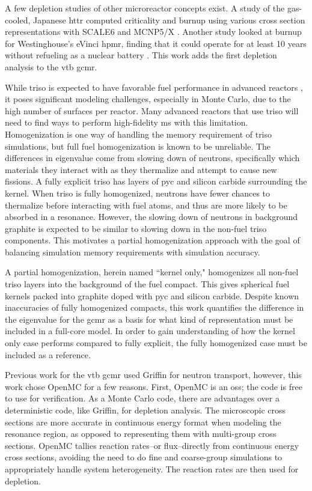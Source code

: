 \documentclass[letterpaper]{physor2024}
\begin{document}
A few depletion studies of other microreactor concepts exist. A study of the gas-cooled, Japanese \gls{httr} computed criticality and burnup using various cross section representations with SCALE6 and MCNP5/X \cite{chiang-gcmr}. Another study looked at burnup for Westinghouse's eVinci \gls{hpmr}, finding that it could operate for at least 10 years without refueling as a nuclear battery \cite{Hernandez-hpmr}. This work adds the first depletion analysis to the \gls{vtb} \gls{gcmr}.

While \gls{triso} is expected to have favorable fuel performance in advanced reactors \cite{triso-overview}, it poses significant modeling challenges, especially in Monte Carlo, due to the high number of surfaces per reactor. Many advanced reactors that use \gls{triso} will need to find ways to perform high-fidelity \gls{ms} with this limitation. Homogenization is one way of handling the memory requirement of \gls{triso} simulations, but full fuel homogenization is known to be unreliable. The differences in eigenvalue come from slowing down of neutrons, specifically which materials they interact with as they thermalize and attempt to cause new fissions. A fully explicit \gls{triso} has layers of \gls{pyc} and silicon carbide surrounding the kernel. When \gls{triso} is fully homogenized, neutrons have fewer chances to thermalize before interacting with fuel atoms, and thus are more likely to be absorbed in a resonance. However, the slowing down of neutrons in background graphite is expected to be similar to slowing down in the non-fuel \gls{triso} components. This motivates a partial homogenization approach with the goal of balancing simulation memory requirements with simulation accuracy.

A partial homogenization, herein named ``kernel only," homogenizes all non-fuel \gls{triso} layers into the background of the fuel compact. This gives spherical fuel kernels packed into graphite doped with \gls{pyc} and silicon carbide. Despite known inaccuracies of fully homogenized compacts, this work quantifies the difference in the eigenvalue for the \gls{gcmr} as a basis for what kind of representation must be included in a full-core model. In order to gain understanding of how the kernel only case performs compared to fully explicit, the fully homogenized case must be included as a reference.

Previous work for the \gls{vtb} \gls{gcmr} used Griffin for neutron transport, however, this work chose OpenMC for a few reasons. First, OpenMC is an \gls{oss}; the code is free to use for verification. As a Monte Carlo code, there are advantages over a deterministic code, like Griffin, for depletion analysis. The microscopic cross sections are more accurate in continuous energy format when modeling the resonance region, as opposed to representing them with multi-group cross sections. OpenMC tallies reaction rates--or flux--directly from continuous energy cross sections, avoiding the need to do fine and coarse-group simulations to appropriately handle system heterogeneity. The reaction rates are then used for depletion.
\end{document}
